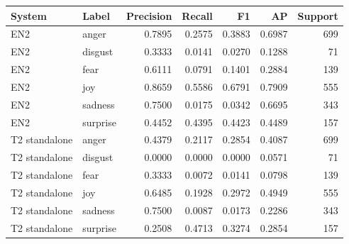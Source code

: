 \begin{tabular}{llrrrrr}
\toprule
System & Label & Precision & Recall & F1 & AP & Support \\
\midrule
EN2 & anger & 0.7895 & 0.2575 & 0.3883 & 0.6987 & 699 \\
EN2 & disgust & 0.3333 & 0.0141 & 0.0270 & 0.1288 & 71 \\
EN2 & fear & 0.6111 & 0.0791 & 0.1401 & 0.2884 & 139 \\
EN2 & joy & 0.8659 & 0.5586 & 0.6791 & 0.7909 & 555 \\
EN2 & sadness & 0.7500 & 0.0175 & 0.0342 & 0.6695 & 343 \\
EN2 & surprise & 0.4452 & 0.4395 & 0.4423 & 0.4489 & 157 \\
T2 standalone & anger & 0.4379 & 0.2117 & 0.2854 & 0.4087 & 699 \\
T2 standalone & disgust & 0.0000 & 0.0000 & 0.0000 & 0.0571 & 71 \\
T2 standalone & fear & 0.3333 & 0.0072 & 0.0141 & 0.0798 & 139 \\
T2 standalone & joy & 0.6485 & 0.1928 & 0.2972 & 0.4949 & 555 \\
T2 standalone & sadness & 0.7500 & 0.0087 & 0.0173 & 0.2286 & 343 \\
T2 standalone & surprise & 0.2508 & 0.4713 & 0.3274 & 0.2854 & 157 \\
\bottomrule
\end{tabular}
